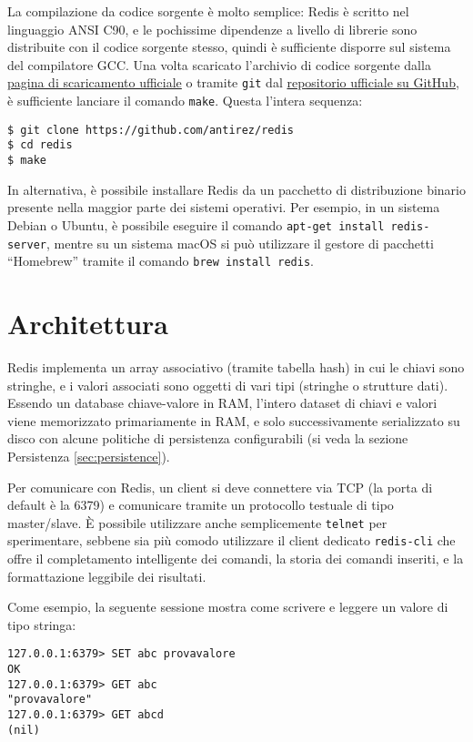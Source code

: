 La compilazione da codice sorgente è molto semplice: Redis è scritto nel linguaggio ANSI C90, e le
pochissime dipendenze a livello di librerie sono distribuite con il codice sorgente stesso, quindi è
sufficiente disporre sul sistema del compilatore GCC. Una volta scaricato l'archivio di codice
sorgente dalla \href{https://redis.io/download}{pagina di scaricamento ufficiale} o tramite
\verb|git| dal \href{https://github.com/antirez/redis}{repositorio ufficiale su GitHub}, è
sufficiente lanciare il comando \verb|make|. Questa l'intera sequenza:

\medskip
\begin{lstlisting}
$ git clone https://github.com/antirez/redis
$ cd redis
$ make
\end{lstlisting}

In alternativa, è possibile installare Redis da un pacchetto di distribuzione binario
presente nella maggior parte dei sistemi operativi. Per esempio, in un sistema Debian
o Ubuntu, è possibile eseguire il comando \verb|apt-get install redis-server|, mentre
su un sistema macOS si può utilizzare il gestore di pacchetti ``Homebrew'' tramite il
comando \verb|brew install redis|.

\section{Architettura}

Redis implementa un array associativo (tramite tabella hash) in cui le chiavi sono stringhe, e i
valori associati sono oggetti di vari tipi (stringhe o strutture dati). Essendo un database
chiave-valore in RAM, l'intero dataset di chiavi e valori viene memorizzato primariamente in RAM, e
solo successivamente serializzato su disco con alcune politiche di persistenza configurabili (si
veda la sezione Persistenza \ref{sec:persistence}).

Per comunicare con Redis, un client si deve connettere via TCP (la porta di default è la 6379) e
comunicare tramite un protocollo testuale di tipo master/slave. È possibile utilizzare
anche semplicemente \verb|telnet| per sperimentare, sebbene sia più comodo utilizzare il
client dedicato \verb|redis-cli| che offre il completamento intelligente dei comandi, la
storia dei comandi inseriti, e la formattazione leggibile dei risultati.

Come esempio, la seguente sessione mostra come scrivere e leggere un valore di tipo
stringa:

\medskip
\begin{lstlisting}
127.0.0.1:6379> SET abc provavalore
OK
127.0.0.1:6379> GET abc
"provavalore"
127.0.0.1:6379> GET abcd
(nil)
\end{lstlisting}

